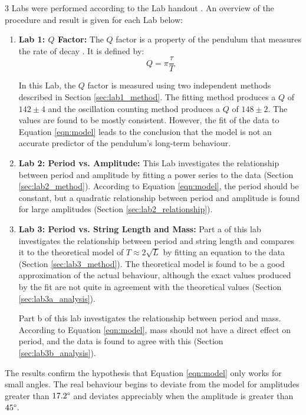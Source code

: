 \documentclass[aps,twocolumn,secnumarabic,nobalancelastpage,amsmath,amssymb,nofootinbib,floatfix,letterpaper]{revtex4}
\begin{document}
3 Labs were performed according to the Lab handout \cite{lab}. An overview of the procedure and result is given for each
Lab below:
\begin{enumerate}
    \item
    \textbf{Lab 1: \(Q\) Factor:}
    The \(Q\) factor is a property of the pendulum that measures the rate of decay \cite{lab}. It is defined by:
    \begin{equation}
        Q = \pi\frac{\tau}{T}
        \label{eqn:qfactor}
    \end{equation}

    In this Lab, the \(Q\) factor is measured using two independent methods described in Section \ref{sec:lab1_method}.
    The fitting method produces a \(Q\) of \(142 \pm 4\) and the oscillation counting method produces a \(Q\) of
    \(148 \pm 2\). The values are found to be mostly consistent. However, the fit of the data to Equation \ref{eqn:model}
    leads to the conclusion that the model is not an accurate predictor of the pendulum's long-term behaviour.

    \item
    \textbf{Lab 2: Period vs. Amplitude:}
    This Lab investigates the relationship between period and amplitude by fitting a power series to the data (Section
    \ref{sec:lab2_method}).
    According to Equation \ref{eqn:model}, the period should be constant, but a quadratic relationship between period and
    amplitude is found for large amplitudes (Section \ref{sec:lab2_relationship}).

    \item
    \textbf{Lab 3: Period vs. String Length and Mass:}
    Part a of this lab investigates the relationship between period and string length and compares it to the theoretical
    model of \(T \approx 2\sqrt{L}\) \cite{lab} by fitting an equation to the data (Section \ref{sec:lab3_method}).
    The theoretical model is found to be a good approximation of the actual behaviour, although the exact values
    produced by the fit are not quite in agreement with the theoretical values (Section \ref{sec:lab3a_analysis}).

    Part b of this lab investigates the relationship between period and mass. According to Equation \ref{eqn:model},
    mass should not have a direct effect on period, and the data is found to agree with this (Section
    \ref{sec:lab3b_analysis}).
\end{enumerate}

The results confirm the hypothesis that Equation \ref{eqn:model} only works for small angles. The real behaviour begins to
deviate from the model for amplitudes greater than \(17.2\degree\) and deviates appreciably when the amplitude is
greater than \(45\degree\).
\end{document}
